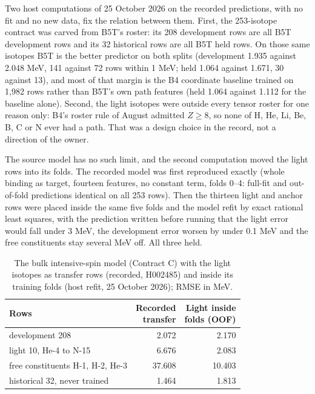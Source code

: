 Two host computations of 25 October 2026 on the recorded predictions, with no fit and no new data, fix the relation between them.\cite{viisameroster,viilightrefit} First, the 253-isotope contract was carved from B5T's roster: its 208 development rows are all B5T development rows and its 32 historical rows are all B5T held rows. On those same isotopes B5T is the better predictor on both splits (development 1.935 against 2.048 MeV, 141 against 72 rows within 1 MeV; held 1.064 against 1.671, 30 against 13), and most of that margin is the B4 coordinate baseline trained on 1,982 rows rather than B5T's own path features (held 1.064 against 1.112 for the baseline alone). Second, the light isotopes were outside every tensor roster for one reason only: B4's roster rule of August admitted $Z\ge8$, so none of H, He, Li, Be, B, C or N ever had a path. That was a design choice in the record, not a direction of the owner.

The source model has no such limit, and the second computation moved the light rows into its folds. The recorded model was first reproduced exactly (whole binding as target, fourteen features, no constant term, folds 0--4: full-fit and out-of-fold predictions identical on all 253 rows). Then the thirteen light and anchor rows were placed inside the same five folds and the model refit by exact rational least squares, with the prediction written before running that the light error would fall under 3 MeV, the development error worsen by under 0.1 MeV and the free constituents stay several MeV off. All three held.

\begin{table}[tb]
\centering\small
\begin{tabularx}{\columnwidth}{@{}Xrr@{}}
\hline
Rows & \shortstack[r]{Recorded\\transfer} & \shortstack[r]{Light inside\\folds (OOF)}\\
\hline
development 208 & 2.072 & 2.170\\
light 10, He-4 to N-15 & 6.676 & 2.083\\
free constituents H-1, H-2, He-3 & 37.608 & 10.403\\
historical 32, never trained & 1.464 & 1.813\\
\hline
\end{tabularx}
\caption{The bulk intensive-spin model (Contract C) with the light isotopes as transfer rows (recorded, H002485) and inside its training folds (host refit, 25 October 2026); RMSE in MeV.}
\label{v2c5:lightrefit}
\end{table}

